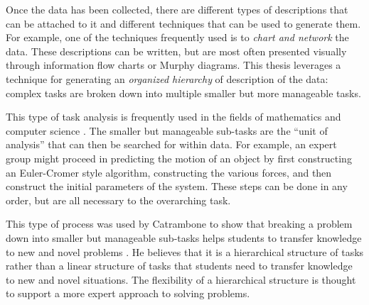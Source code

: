 \documentclass{msuphddissertation}
\begin{document}
\begin{doublespace}
Once the data has been collected, there are different types of descriptions that can be attached to it and different techniques that can be used to generate them.  For example, one of the techniques frequently used is to \textit{chart and network} the data.  These descriptions can be written, but are most often presented visually through information flow charts or Murphy diagrams.  This thesis leverages a technique for generating an \textit{organized hierarchy} of description of the data: complex tasks are broken down into multiple smaller but more manageable tasks.

This type of task analysis is frequently used in the fields of mathematics and computer science \cite{Catrambone1998,Chandra1990,Fitzgerald2008,Ahmadzedah2005}.  The smaller but manageable sub-tasks are the ``unit of analysis'' that can then be searched for within data.  For example, an expert group might proceed in predicting the motion of an object by first constructing an Euler-Cromer style algorithm, constructing the various forces, and then construct the initial parameters of the system.  These steps can be done in any order, but are all necessary to the overarching task.

This type of process was used by Catrambone to show that breaking a problem down into smaller but manageable sub-tasks helps students to transfer knowledge to new and novel problems \cite{Catrambone1998}.  He believes that it is a hierarchical structure of tasks rather than a linear structure of tasks that students need to transfer knowledge to new and novel situations.  The flexibility of a hierarchical structure is thought to support a more expert approach to solving problems.


\end{doublespace}
\end{document}

